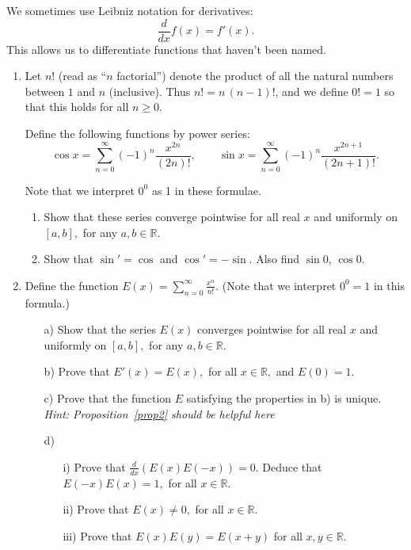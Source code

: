 \documentclass[openany, amssymb, psamsfonts]{amsart}
\newcommand{\bbR}{\mathbb{R}}
\theoremstyle{definition}
\numberwithin{equation}{section}
\begin{document}
We sometimes use Leibniz notation for derivatives:
\[
\frac d{dx} f(x) = f'(x).
\]
This allows us to differentiate functions that haven't been named. 



\begin{enumerate}



\item

Let $n!$ (read as ``$n$ factorial'') denote the product of all the natural numbers between $1$ and $n$ (inclusive).
Thus $n!=n\,(n-1)!$, and we define $0!=1$ so that this holds for all $n\ge0$.

Define the following functions by power series:
\[
\cos x=\sum_{n=0}^\infty (-1)^n\frac{x^{2n}}{(2n)!},\qquad
\sin x=\sum_{n=0}^\infty (-1)^n\frac{x^{2n+1}}{(2n+1)!}.
\]

Note that we interpret $0^0$ as 1 in these formulae.

\begin{enumerate}

\item
Show that these series converge pointwise for all real $x$ and uniformly on $[a,b],$ for any $a,b\in \bbR.$ 



\item
Show that  $\sin'=\cos$ and $\cos'=-\sin$.
Also find $\sin 0$, $\cos 0$.
\end{enumerate}


\item 

Define the function $\displaystyle E(x)=\sum_{n=0}^\infty \frac{x^n}{n!}.$ (Note that we interpret $0^0=1$ in this formula.)
\begin{enumerate}
\item[a)] Show that the series  $E(x)$ converges pointwise for all real $x$ and uniformly on $[a,b],$ for any $a,b\in \bbR.$ 
\item[b)] Prove that $E'(x)=E(x),$ for all $x\in \bbR,$ and $E(0)=1.$
\item[c)] Prove that the function $E$ satisfying the properties in b) is unique. {\em Hint: Proposition~\ref{prop2} should be helpful here}
\item[d)] 

\begin{enumerate} 
\item[i)] Prove that $\frac{d}{dx} (E(x)E(-x)) =0.$ Deduce that $E(-x)E(x)=1,$ for all $x\in\bbR.$ 
\item[ii)] Prove that $E(x)\neq 0,$ for all $x\in \bbR.$
\item[iii)]
Prove that $E(x)E(y)=E(x+y)$ for all $x,y\in\bbR$.


\end{enumerate}
\end{enumerate}
\end{enumerate}
\end{document}
